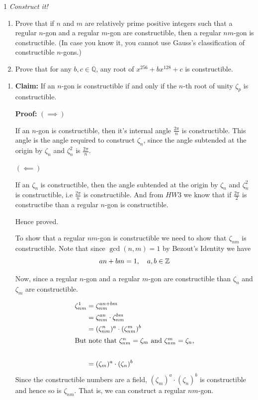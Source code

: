 \documentclass[12pt]{article}
\begin{document}


\begin{problem}{1}
\textit{Construct it!}
\begin{enumerate}
    \item[(a)] Prove that if $n$ and $m$ are relatively prime positive integers such that a regular $n$-gon
    and a regular $m$-gon are constructible, then a regular $nm$-gon is constructible.
    (In case you know it, you cannot use Gauss’s classification of constructible $n$-gons.)

    \item[(b)] Prove that for any $b,c \in \mathbb{Q}$, any root of $x^{256}+bx^{128}+c$ is constructible.
\end{enumerate}
\end{problem}

\begin{solution}
    \bbni 
    \begin{enumerate}
        \item \textbf{Claim:} If an $n$-gon is constructible if and only if the $n$-th root of unity $\zeta_p$ is constructible. 
        
        \textbf{Proof:} 
        $(\implies)$

        If an $n$-gon is constructible, then it's internal angle $\frac{2\pi}{n}$ is constructible. This angle is the angle required to construct $\zeta_n$, since the angle subtended at the origin by $\zeta_n$ and $\zeta_n^2$ is $\frac{2\pi}{n}$. 

        $(\impliedby)$

        If an $\zeta_n$ is constructible, then the angle subtended at the origin by $\zeta_n$ and $\zeta_n^2$ is constructible, i.e $\frac{2\pi}{n}$ is constructible. And from $HW3$ we know that if $\frac{2\pi}{2}$ is constructibe than a regular $n$-gon is constructible. 
        
        Hence proved. 

        To show that a regular $nm$-gon is constructible we need to show that $\zeta_{nm}$ is constructible. Note that since $\gcd(n,m) = 1$ by Bezout's Identity we have 
        \[an + bm = 1, \quad a, b \in \mathbb Z\]

        Now, since a regular $n$-gon and a regular $m$-gon are constructible than $\zeta_n$ and $\zeta_m$ are constructible. 

        \begin{align*}
            \zeta_{nm}^1 &= \zeta_{nm}^{an + bm} \\
                        &= \zeta_{nm}^{an} \cdot \zeta_{nm}^{bm}  \\ 
                         &= (\zeta_{nm}^{n})^a \cdot (\zeta_{nm}^{m})^b \\
            \intertext{But note that $\zeta_{nm}^n = \zeta_m$ and $\zeta_{nm}^m = \zeta_n$,}  \\ 
                         &= (\zeta_m)^a \cdot (\zeta_{n})^b 
        \end{align*}
         Since the constructible numbers are a field, $(\zeta_m)^a \cdot (\zeta_{n})^b$ is constructible and hence so is $\zeta_{nm}$. That is, we can construct a regular $nm$-gon. 


\end{enumerate}
\end{solution}
\end{document}

